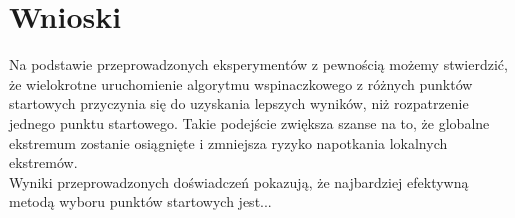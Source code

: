 \documentclass{article}
\begin{document}
\section{Wnioski}

Na podstawie przeprowadzonych eksperymentów z pewnością możemy stwierdzić, że wielokrotne uruchomienie algorytmu wspinaczkowego z różnych punktów startowych przyczynia się do uzyskania lepszych wyników, niż rozpatrzenie jednego punktu startowego. Takie podejście zwiększa szanse na to, że globalne ekstremum zostanie osiągnięte i zmniejsza ryzyko napotkania lokalnych ekstremów.\\

Wyniki przeprowadzonych doświadczeń pokazują, że najbardziej efektywną metodą wyboru punktów startowych jest...
\end{document}
